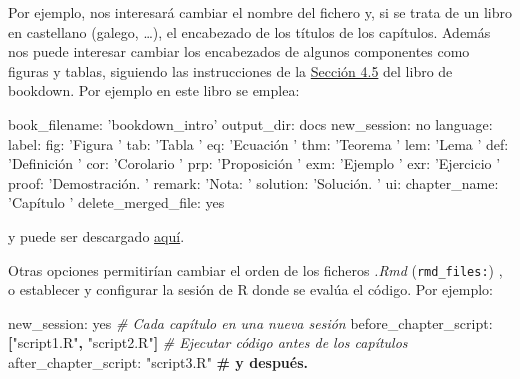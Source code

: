 \documentclass[]{book}
\newenvironment{Shaded}{\begin{snugshade}}{\end{snugshade}}
\newcommand{\KeywordTok}[1]{\textcolor[rgb]{0.13,0.29,0.53}{\textbf{#1}}}
\newcommand{\StringTok}[1]{\textcolor[rgb]{0.31,0.60,0.02}{#1}}
\newcommand{\CommentTok}[1]{\textcolor[rgb]{0.56,0.35,0.01}{\textit{#1}}}
\newcommand{\FunctionTok}[1]{\textcolor[rgb]{0.00,0.00,0.00}{#1}}
\newcommand{\AttributeTok}[1]{\textcolor[rgb]{0.77,0.63,0.00}{#1}}
\newcommand{\ErrorTok}[1]{\textcolor[rgb]{0.64,0.00,0.00}{\textbf{#1}}}
\theoremstyle{definition}
\theoremstyle{definition}
\theoremstyle{definition}
\theoremstyle{remark}
\begin{document}
Por ejemplo, nos interesará cambiar el nombre del fichero y, si se trata
de un libro en castellano (galego, \ldots{}), el encabezado de los
títulos de los capítulos. Además nos puede interesar cambiar los
encabezados de algunos componentes como figuras y tablas, siguiendo las
instrucciones de la
\href{https://bookdown.org/yihui/bookdown/internationalization.html}{Sección
4.5} del libro de bookdown. Por ejemplo en este libro se emplea:

\begin{Shaded}
\begin{Highlighting}[]
\FunctionTok{book_filename:}\AttributeTok{ }\StringTok{'bookdown_intro'}
\FunctionTok{output_dir:}\AttributeTok{ docs}
\FunctionTok{new_session:}\AttributeTok{ no}
\FunctionTok{language:}
  \FunctionTok{label:}
    \FunctionTok{fig:}\AttributeTok{ }\StringTok{'Figura '}
    \FunctionTok{tab:}\AttributeTok{ }\StringTok{'Tabla '}
    \FunctionTok{eq:}\AttributeTok{ }\StringTok{'Ecuación '}
    \FunctionTok{thm:}\AttributeTok{ }\StringTok{'Teorema '}
    \FunctionTok{lem:}\AttributeTok{ }\StringTok{'Lema '}
    \FunctionTok{def:}\AttributeTok{ }\StringTok{'Definición '}
    \FunctionTok{cor:}\AttributeTok{ }\StringTok{'Corolario '}
    \FunctionTok{prp:}\AttributeTok{ }\StringTok{'Proposición '}
    \FunctionTok{exm:}\AttributeTok{ }\StringTok{'Ejemplo '}
    \FunctionTok{exr:}\AttributeTok{ }\StringTok{'Ejercicio '}
    \FunctionTok{proof:}\AttributeTok{ }\StringTok{'Demostración. '}
    \FunctionTok{remark:}\AttributeTok{ }\StringTok{'Nota: '}
    \FunctionTok{solution:}\AttributeTok{ }\StringTok{'Solución. '}
  \FunctionTok{ui:}
    \FunctionTok{chapter_name:}\AttributeTok{ }\StringTok{'Capítulo '}
\FunctionTok{delete_merged_file:}\AttributeTok{ yes}
\end{Highlighting}
\end{Shaded}

y puede ser descargado
\href{https://github.com/rubenfcasal/bookdown_intro/raw/master/_bookdown.yml}{aquí}.

Otras opciones permitirían cambiar el orden de los ficheros \emph{.Rmd}
(\texttt{rmd\_files:}) , o establecer y configurar la sesión de R donde
se evalúa el código. Por ejemplo:

\begin{Shaded}
\begin{Highlighting}[]
\FunctionTok{new_session:}\AttributeTok{ yes                                    }\CommentTok{# Cada capítulo en una nueva sesión}
\FunctionTok{before_chapter_script:}\AttributeTok{ }\KeywordTok{[}\StringTok{"script1.R"}\KeywordTok{,} \StringTok{"script2.R"}\KeywordTok{]}\AttributeTok{   }\CommentTok{# Ejecutar código antes de los capítulos}
\FunctionTok{after_chapter_script:}\AttributeTok{ }\StringTok{"script3.R"}\ErrorTok{                   # y después.}
\end{Highlighting}
\end{Shaded}
\end{document}
